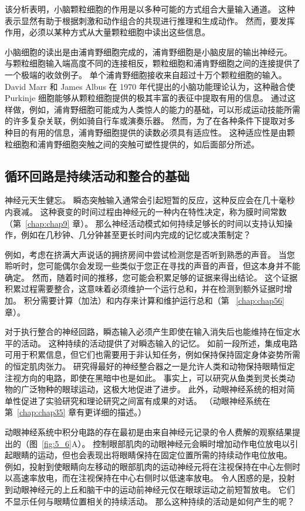 该分析表明，小脑颗粒细胞的作用是以多种可能的方式组合大量输入通道。
这种表示显然有助于根据刺激和动作组合的共现进行推理和生成动作。
然而，要发挥作用，必须以某种方式从大量颗粒细胞中读出这些信息。


小脑细胞的读出是由浦肯野细胞完成的，浦肯野细胞是小脑皮层的输出神经元。
与颗粒细胞输入端高度不同的连接相反，颗粒细胞和浦肯野细胞之间的连接提供了一个极端的收敛例子。
单个浦肯野细胞接收来自超过十万个颗粒细胞的输入。
David Marr 和 James Albus 在 1970 年代提出的小脑功能理论认为，这种融合使 Purkinje 细胞能够从颗粒细胞提供的极其丰富的表征中提取有用的信息。
通过这样做，例如，浦肯野细胞可能成为人类惊人的能力的基础，可以形成运动技能所需的许多复杂关联，例如骑自行车或演奏乐器。
然而，为了在各种条件下提取对多种目的有用的信息，浦肯野细胞提供的读数必须具有适应性。
这种适应性是由颗粒细胞和浦肯野细胞突触之间的突触可塑性提供的，如后面部分所述。



\subsection{循环回路是持续活动和整合的基础}

神经元天生健忘。 
瞬态突触输入通常会引起短暂的反应，这种反应会在几十毫秒内衰减。
这种衰变的时间过程由神经元的一种内在特性决定，称为膜时间常数（第~\ref{chap:chap9} 章）。
那么神经活动模式如何持续足够长的时间以支持认知操作，例如在几秒钟、几分钟甚至更长时间内完成的记忆或决策制定？


例如，考虑在挤满大声说话的拥挤房间中尝试检测您是否听到熟悉的声音。
当您聆听时，您可能偶尔会发现一些类似于您正在寻找的声音的声音，但这本身并不能确定。
然而，随着时间的推移，您可能会积累足够的证据来得出结论。
这个证据积累过程需要整合，这意味着必须维护一个运行总和，并在检测到额外证据时增加。
积分需要计算（加法）和内存来计算和维护运行总和（第 ~\ref{chap:chap56} 章）。


对于执行整合的神经回路，瞬态输入必须产生即使在输入消失后也能维持在恒定水平的活动。
这种持续的活动提供了对瞬态输入的记忆。
如前一段所述，集成电路可用于积累信息，但它们也需要用于非认知任务，例如保持保持固定身体姿势所需的恒定肌肉张力。
研究得最好的神经整合器之一是允许人类和动物保持眼睛恒定注视方向的电路，即使在黑暗中也是如此。
事实上，可以研究从鱼类到灵长类动物的广泛物种的眼球运动，这极大地促进了进步。
此外，动眼神经系统的相对简单性促进了实验研究和理论研究之间富有成果的对话。
（动眼神经系统在第~\ref{chap:chap35} 章有更详细的描述。）


动眼神经系统中积分电路的存在最初是由来自神经元记录的令人费解的观察结果提出的（图~\ref{fig:5_6}A）。
控制眼部肌肉的动眼神经元会瞬时增加动作电位放电以引起眼睛的运动，但也会表现出将眼睛保持在固定位置所需的持续动作电位放电。
例如，投射到使眼睛向左移动的眼部肌肉的运动神经元将在注视保持在中心左侧时以高速率放电，而在注视保持在中心右侧时以低速率放电。
令人困惑的是，投射到动眼神经元的上丘和脑干中的运动前神经元仅在眼球运动之前短暂放电。
它们不显示任何与眼睛位置相关的持续活动。
那么这种持续的活动是如何产生的呢？


